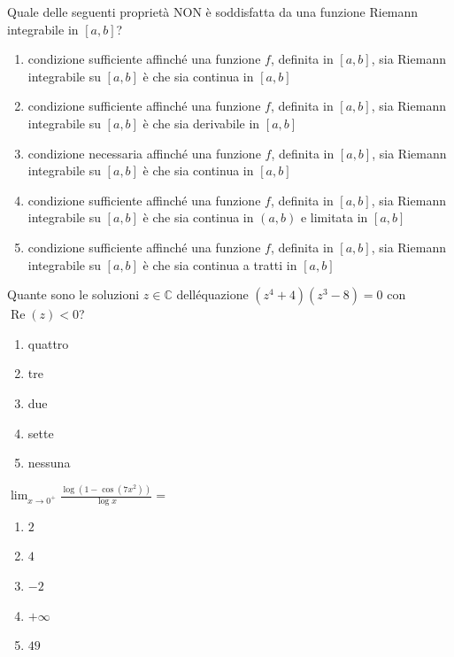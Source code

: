\begin{quiz}
Quale delle seguenti propriet\`a NON \`e soddisfatta da una funzione Riemann integrabile in $[a,b]$?
\begin{enumerate}
\item condizione sufficiente affinch\'e una funzione $f$, definita in $[a,b]$, sia Riemann integrabile su $[a,b]$ \`e che sia continua in $[a,b]$
\item condizione sufficiente affinch\'e una funzione $f$, definita in $[a,b]$, sia Riemann integrabile su $[a,b]$ \`e che sia derivabile in $[a,b]$
\item condizione necessaria affinch\'e una funzione $f$, definita in $[a,b]$, sia Riemann integrabile su $[a,b]$ \`e che sia continua in $[a,b]$
\item condizione sufficiente affinch\'e una funzione $f$, definita in $[a,b]$, sia Riemann integrabile su $[a,b]$ \`e che sia continua in $(a,b)$ e limitata in $[a,b]$
\item condizione sufficiente affinch\'e una funzione $f$, definita in $[a,b]$, sia Riemann integrabile su $[a,b]$ \`e che sia continua a tratti in $[a,b]$
\end{enumerate}
\end{quiz}

\begin{quiz}
Quante sono le soluzioni $z\in\mathbb C$ dell\'equazione $(z^4+4)(z^3-8)=0$ con $\operatorname{Re}(z)<0$?
\begin{enumerate}
\item quattro
\item tre
\item due
\item sette
\item nessuna
\end{enumerate}
\end{quiz}

\begin{quiz}
$\displaystyle\lim_{x\to0^+}\frac{\log(1-\cos(7x^2))}{\log x}=$
\begin{enumerate}
\item $2$
\item $4$
\item $-2$
\item $+\infty$
\item $49$
\end{enumerate}
\end{quiz}

